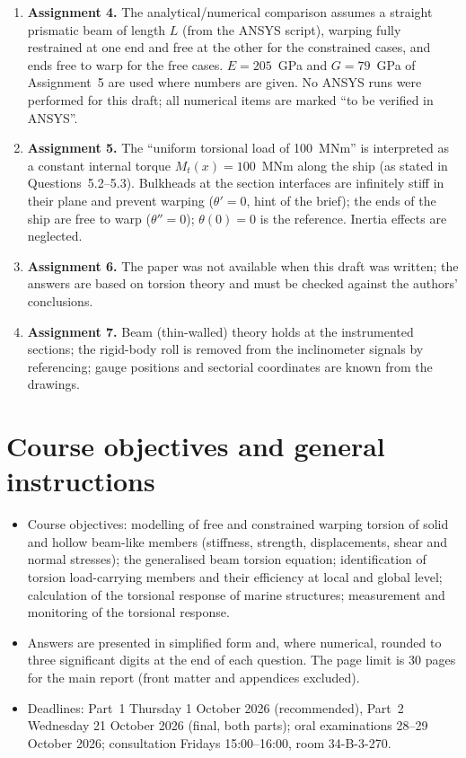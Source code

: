 \begin{enumerate}[label=A\arabic*., leftmargin=*]
  \item \textbf{Assignment 4.} The analytical/numerical comparison assumes a straight prismatic beam of length $L$ (from the ANSYS script), warping fully restrained at one end and free at the other for the constrained cases, and ends free to warp for the free cases. $E=205$~GPa and $G=79$~GPa of Assignment~5 are used where numbers are given. No ANSYS runs were performed for this draft; all numerical items are marked ``to be verified in ANSYS''.
  \item \textbf{Assignment 5.} The ``uniform torsional load of 100~MNm'' is interpreted as a constant internal torque $M_t(x)=100$~MNm along the ship (as stated in Questions~5.2--5.3). Bulkheads at the section interfaces are infinitely stiff in their plane and prevent warping ($\theta'=0$, hint of the brief); the ends of the ship are free to warp ($\theta''=0$); $\theta(0)=0$ is the reference. Inertia effects are neglected.
  \item \textbf{Assignment 6.} The paper was not available when this draft was written; the answers are based on torsion theory and must be checked against the authors' conclusions.
  \item \textbf{Assignment 7.} Beam (thin-walled) theory holds at the instrumented sections; the rigid-body roll is removed from the inclinometer signals by referencing; gauge positions and sectorial coordinates are known from the drawings.
\end{enumerate}

\section{Course objectives and general instructions}

\begin{itemize}
  \item Course objectives: modelling of free and constrained warping torsion of solid and hollow beam-like members (stiffness, strength, displacements, shear and normal stresses); the generalised beam torsion equation; identification of torsion load-carrying members and their efficiency at local and global level; calculation of the torsional response of marine structures; measurement and monitoring of the torsional response.
  \item Answers are presented in simplified form and, where numerical, rounded to three significant digits at the end of each question. The page limit is 30 pages for the main report (front matter and appendices excluded).
  \item Deadlines: Part~1 Thursday 1 October 2026 (recommended), Part~2 Wednesday 21 October 2026 (final, both parts); oral examinations 28--29 October 2026; consultation Fridays 15:00--16:00, room 34-B-3-270.
\end{itemize}
